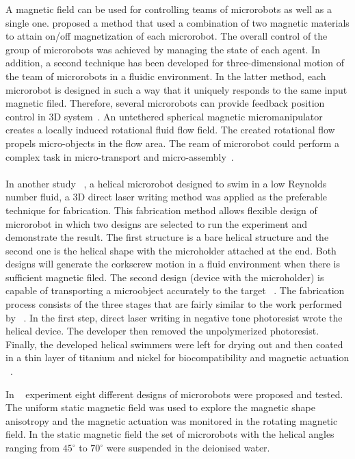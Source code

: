 \documentclass[a4paper,11pt]{article}
\begin{document}
\begin{sloppypar}
A magnetic field can be used for controlling teams of microrobots as well as a single 
one. \citeauthor{kim2013fabrication} proposed a method that used a combination of two magnetic materials to 
attain on/off magnetization of each microrobot. The overall control of the group of microrobots 
was achieved by managing the state of each agent. In addition, a second technique has been 
developed for three-dimensional motion of the team of microrobots in a fluidic environment. In
 the latter method, each microrobot is designed in such a way that it uniquely responds to the 
same input magnetic filed. Therefore, several microrobots can provide feedback position control in 
3D system~\citep{kim2013fabrication}.
An untethered spherical magnetic micromanipulator creates a locally induced rotational fluid flow field. 
The created rotational flow propels micro-objects in the flow area. The ream of microrobot could perform
 a complex task in micro-transport and micro-assembly~\citep{kim2013fabrication}.

\paragraph{}
In another study ~\citep{tottori2012magnetic}, a helical microrobot designed to swim in a low Reynolds number fluid, a 3D 
direct laser writing method was applied as the preferable technique for fabrication. This fabrication 
method allows flexible design of microrobot in which two designs are selected to run the experiment 
and demonstrate the result. The first structure is a bare helical structure and the second one is the
 helical shape with the microholder attached at the end. Both designs will generate the corkscrew
 motion in a fluid environment when there is sufficient magnetic filed. The second 
design (device with the microholder) is capable of transporting a microobject accurately to the 
target ~\citep{tottori2012magnetic}.
The fabrication process consists of the three stages that are fairly similar to the work
 performed by ~\citeauthor{kim2013fabrication}. In the first step, direct laser writing in negative tone photoresist 
wrote the helical device. The developer then removed the unpolymerized photoresist. Finally, the 
developed helical swimmers were left for drying out and then coated in a thin layer of titanium and 
nickel for biocompatibility and magnetic actuation ~\citep{tottori2012magnetic}.

In ~\citeauthor{tottori2012magnetic} experiment eight different designs of microrobots were proposed and tested. 
The uniform static magnetic field was used to explore the magnetic shape anisotropy and the 
magnetic actuation was monitored in the rotating magnetic field. In the static magnetic field the 
set of microrobots with the helical angles ranging from ${45^{\circ}}$ to ${70^{\circ}}$ were suspended in the deionised water. 


\end{sloppypar}
\end{document}
